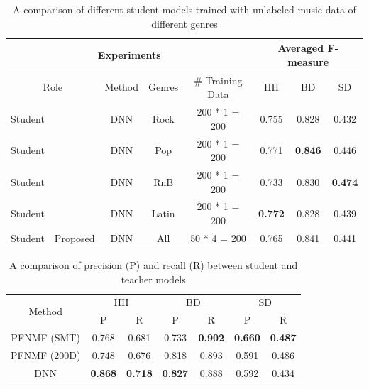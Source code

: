 \documentclass{article}
\begin{document}
\begin{table}[]
\centering
\begin{tabular}{cccccccc}
\hline
\multicolumn{5}{c}{Experiments}                               & \multicolumn{3}{c}{Averaged F-measure}           \\ \hline
\multicolumn{2}{c}{Role} & Method & Genres & \# Training Data & HH             & BD             & SD             \\ \hline
Student    &             & DNN    & Rock   & 200 * 1 = 200    & 0.755          & 0.828          & 0.432          \\
Student    &             & DNN    & Pop    & 200 * 1 = 200    & 0.771          & \textbf{0.846} & 0.446          \\
Student    &             & DNN    & RnB    & 200 * 1 = 200    & 0.733          & 0.830          & \textbf{0.474} \\
Student    &             & DNN    & Latin  & 200 * 1 = 200    & \textbf{0.772} & 0.828          & 0.439          \\
Student    & Proposed    & DNN    & All    & 50 * 4 = 200     & 0.765          & 0.841          & 0.441          \\ \hline
\end{tabular}
\caption{A comparison of different student models trained with unlabeled music data of different genres}
\label{tab:genre_results}
\end{table}


\begin{table}[]
\begin{footnotesize}
\centering
\begin{tabular}{ccccccc}
\hline
\multirow{2}{*}{Method} & \multicolumn{2}{c}{HH}          & \multicolumn{2}{c}{BD}          & \multicolumn{2}{c}{SD}          \\ \cline{2-7} 
                        & P              & R              & P              & R              & P              & R              \\ \hline
PFNMF (SMT)             & 0.768          & 0.681          & 0.733          & \textbf{0.902} & \textbf{0.660} & \textbf{0.487} \\
PFNMF (200D)            & 0.748          & 0.676          & 0.818          & 0.893          & 0.591          & 0.486          \\
DNN                     & \textbf{0.868} & \textbf{0.718} & \textbf{0.827} & 0.888          & 0.592          & 0.434          \\ \hline
\end{tabular}
\caption{A comparison of precision (P) and recall (R) between student and teacher models}
\label{tab:pr_comp}
\end{footnotesize}
\end{table}
\end{document}
